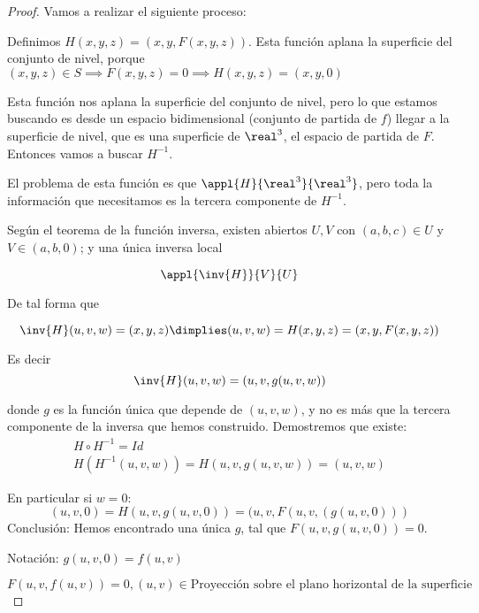\begin{proof} Vamos a realizar el siguiente proceso:

Definimos $H(x,y,z) = (x,y,F(x,y,z))$. Esta función aplana la superficie del conjunto de nivel, porque $(x,y,z) \in S \implies F(x,y,z)=0 \implies H(x,y,z) = (x,y,0)$

Esta función nos aplana la superficie del conjunto de nivel, pero lo que estamos buscando es desde un espacio bidimensional (conjunto de partida de $f$) llegar a la superficie de nivel, que es una superficie de $\real^3$, el espacio de partida de $F$. Entonces vamos a buscar $H^{-1}$.

El problema de esta función es que $\appl{H}{\real^3}{\real^3}$, pero toda la información que necesitamos es la tercera componente de $H^{-1}$.

Según el teorema de la función inversa, existen abiertos $U, V$ con $(a,b,c) \in U$ y  $V\in (a,b,0)$; y una única inversa local 

\[ \appl{\inv{H}}{V}{U} \]

De tal forma que 

\[ \inv{H}(u,v,w) = (x,y,z) \dimplies (u,v,w) = H(x,y,z) = (x,y,F(x,y,z)) \]

Es decir \[ \inv{H} (u,v,w) = (u,v,g(u,v,w)) \]

donde $g$ es la función única que depende de $(u,v,	w)$, y no es más que la tercera componente de la inversa que hemos construido. Demostremos que existe: 
 \begin{gather*}
 H\circ H^{-1} = Id \\
 H(H^{-1}(u,v,w)) = H(u,v,g(u,v,w)) = (u,v,w)
 \end{gather*}
 
 En particular si $w=0$:
 $$(u,v,0) = H(u,v,g(u,v,0)) = (u,v,F(u,v,(g(u,v,0)))$$
 Conclusión: Hemos encontrado una única $g$, tal que $F(u,v,g(u,v,0)) = 0$.
 
  Notación: $g(u,v,0) = f(u,v)$
  
  $F(u,v,f(u,v)) = 0, (u,v) \in \text{Proyección sobre el plano horizontal de la superficie}$
 
\end{proof}

